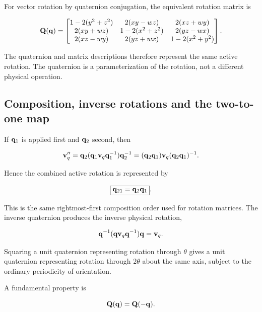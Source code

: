 For vector rotation by quaternion conjugation, the equivalent rotation matrix is

\begin{equation}\label{eq:coord-quaternion-matrix}
\mathbf{Q}(\mathbf{q})=
\begin{bmatrix}
1-2(y^2+z^2)&2(xy-wz)&2(xz+wy)\\
2(xy+wz)&1-2(x^2+z^2)&2(yz-wx)\\
2(xz-wy)&2(yz+wx)&1-2(x^2+y^2)
\end{bmatrix}.
\end{equation}

The quaternion and matrix descriptions therefore represent the same active
rotation. The quaternion is a parameterization of the rotation, not a different
physical operation.

\subsection{Composition, inverse rotations and the two-to-one map}

If $\mathbf{q}_1$ is applied first and $\mathbf{q}_2$ second, then

\begin{equation}
    \mathbf{v}''_q
    =\mathbf{q}_2(\mathbf{q}_1\mathbf{v}_q\mathbf{q}_1^{-1})\mathbf{q}_2^{-1}
    =(\mathbf{q}_2\mathbf{q}_1)\mathbf{v}_q(\mathbf{q}_2\mathbf{q}_1)^{-1}.
\end{equation}

Hence the combined active rotation is represented by

\begin{equation}
    \boxed{\mathbf{q}_{21}=\mathbf{q}_2\mathbf{q}_1}.
\end{equation}

This is the same rightmost-first composition order used for rotation matrices.
The inverse quaternion produces the inverse physical rotation,

\begin{equation}
    \mathbf{q}^{-1}
    (\mathbf{q}\mathbf{v}_q\mathbf{q}^{-1})
    \mathbf{q}
    =\mathbf{v}_q.
\end{equation}

Squaring a unit quaternion representing rotation through $\theta$ gives a unit
quaternion representing rotation through $2\theta$ about the same axis, subject
to the ordinary periodicity of orientation.

A fundamental property is

\begin{equation}
    \mathbf{Q}(\mathbf{q})=\mathbf{Q}(-\mathbf{q}).
\end{equation}

